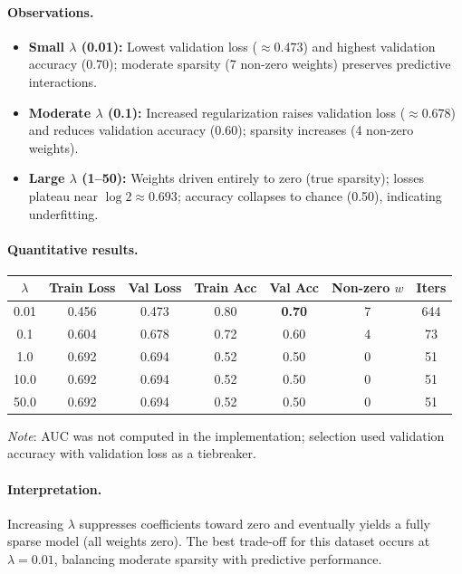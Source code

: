 \documentclass[12pt]{article}
\begin{document}
\paragraph{Observations.}
\begin{itemize}
\item \textbf{Small $\lambda$ (0.01):} Lowest validation loss ($\approx0.473$) and highest validation accuracy (0.70); moderate sparsity (7 non-zero weights) preserves predictive interactions.
\item \textbf{Moderate $\lambda$ (0.1):} Increased regularization raises validation loss ($\approx0.678$) and reduces validation accuracy (0.60); sparsity increases (4 non-zero weights).
\item \textbf{Large $\lambda$ (1–50):} Weights driven entirely to zero (true sparsity); losses plateau near $\log 2\approx0.693$; accuracy collapses to chance (0.50), indicating underfitting.
\end{itemize}

\paragraph{Quantitative results.}
\begin{center}
\begin{threeparttable}
\caption{Metrics at convergence for different $\lambda$ ($\alpha=0.5$).}
\label{tab:valmetrics}
\begin{tabular}{ccccccc}
\toprule
$\lambda$ & Train Loss & Val Loss & Train Acc & Val Acc & Non-zero $w$ & Iters\\
\midrule
0.01 & 0.456 & 0.473 & 0.80 & \textbf{0.70} & 7 & 644\\
0.1  & 0.604 & 0.678 & 0.72 & 0.60 & 4 & 73\\
1.0  & 0.692 & 0.694 & 0.52 & 0.50 & 0 & 51\\
10.0 & 0.692 & 0.694 & 0.52 & 0.50 & 0 & 51\\
50.0 & 0.692 & 0.694 & 0.52 & 0.50 & 0 & 51\\
\bottomrule
\end{tabular}
\begin{tablenotes}
\item \textit{Note}: AUC was not computed in the implementation; selection used validation accuracy with validation loss as a tiebreaker.
\end{tablenotes}
\end{threeparttable}
\end{center}

\paragraph{Interpretation.}
Increasing $\lambda$ suppresses coefficients toward zero and eventually yields a fully sparse model (all weights zero). The best trade-off for this dataset occurs at $\lambda=0.01$, balancing moderate sparsity with predictive performance.
\end{document}
